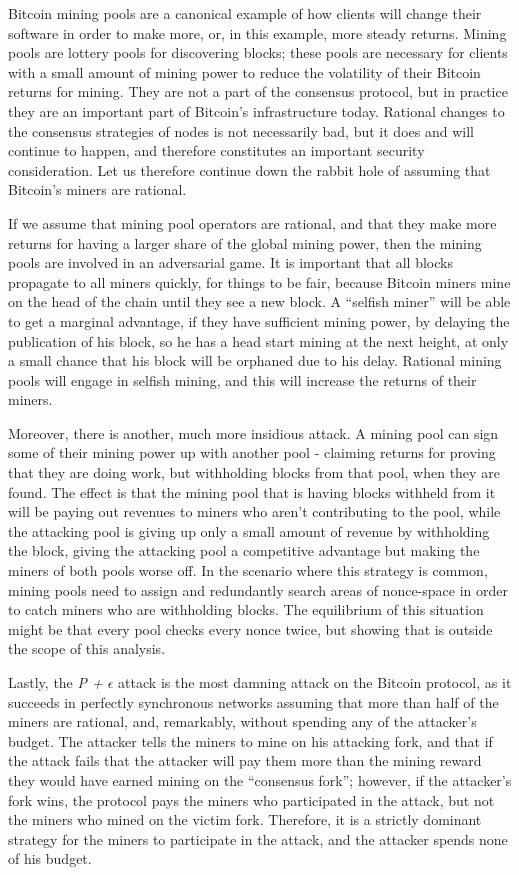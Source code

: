 \documentclass[11pt,a4paper]{article}
\theoremstyle{plain}
\theoremstyle{definition}
\begin{document}
Bitcoin mining pools are a canonical example of how clients will change their software in order to make more, or, in this example, more steady returns. Mining pools are lottery pools for discovering blocks; these pools are necessary for clients with a small amount of mining power to reduce the volatility of their Bitcoin returns for mining. They are not a part of the consensus protocol, but in practice they are an important part of Bitcoin's infrastructure today. Rational changes to the consensus strategies of nodes is not necessarily bad, but it does and will continue to happen, and therefore constitutes an important security consideration. Let us therefore continue down the rabbit hole of assuming that Bitcoin's miners are rational.

If we assume that mining pool operators are rational, and that they make more returns for having a larger share of the global mining power, then the mining pools are involved in an adversarial game. It is important that all blocks propagate to all miners quickly, for things to be fair, because Bitcoin miners mine on the head of the chain until they see a new block. A ``selfish miner'' will be able to get a marginal advantage, if they have sufficient mining power, by delaying the publication of his block, so he has a head start mining at the next height, at only a small chance that his block will be orphaned due to his delay. Rational mining pools will engage in selfish mining, and this will increase the returns of their miners. \cite{SelfishMining}

Moreover, there is another, much more insidious attack. A mining pool can sign some of their mining power up with another pool - claiming returns for proving that they are doing work, but withholding blocks from that pool, when they are found. The effect is that the mining pool that is having blocks withheld from it will be paying out revenues to miners who aren't contributing to the pool, while the attacking pool is giving up only a small amount of revenue by withholding the block, giving the attacking pool a competitive advantage but making the miners of both pools worse off. In the scenario where this strategy is common, mining pools need to assign and redundantly search areas of nonce-space in order to catch miners who are withholding blocks. The equilibrium of this situation might be that every pool checks every nonce twice, but showing that is outside the scope of this analysis. \cite{BlockWithholding}

Lastly, the \emph{P + $\epsilon$} attack is the most damning attack on the Bitcoin protocol, as it succeeds in perfectly synchronous networks assuming that more than half of the miners are rational, and, remarkably, without spending any of the attacker's budget. The attacker tells the miners to mine on his attacking fork, and that if the attack fails that the attacker will pay them more than the mining reward they would have earned mining on the ``consensus fork''; however, if the attacker's fork wins, the protocol pays the miners who participated in the attack, but not the miners who mined on the victim fork. Therefore, it is a strictly dominant strategy for the miners to participate in the attack, and the attacker spends none of his budget. \cite{P_Plus_Epsilon}
\end{document}
